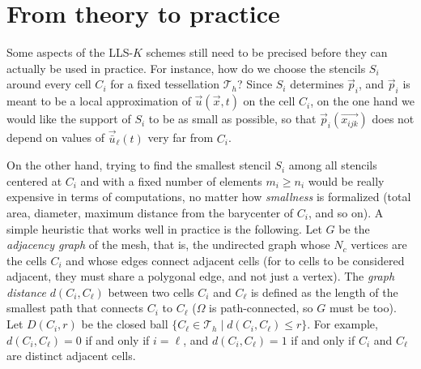 %
%
%

\section{From theory to practice} \label{sec:theory-to-practice}
Some aspects of the LLS-$K$ schemes still need to be precised
before they can actually be used in practice. For instance, how do we choose
the stencils $S_{i}$ around every cell $C_{i}$ for a fixed tessellation
$\mathcal{T}_{h}$? Since $S_{i}$ determines $\vec{p}_{i}$, and $\vec{p}_{i}$
is meant to be a local approximation of $\vec{u}(\vec{x},t)$ on the cell
$C_{i}$, on the one hand we would like the support of $S_{i}$ to be as small
as possible, so that $\vec{p}_{i}(\vec{x_{ijk}})$ does not depend on
values of $\vec{\bar{u}}_{\ell}(t)$ very far from $C_{i}$.

On the other hand, trying to find the smallest stencil
$S_{i}$ among all stencils centered at $C_{i}$ and with a fixed number of
elements $m_{i}\geq n_{i}$ would be really expensive in terms of computations,
no matter how \emph{smallness} is formalized (total area, diameter, maximum
distance from the barycenter of $C_{i}$, and so on). A simple heuristic that
works well in practice is the following.
%
Let $G$ be the \emph{adjacency graph} of the mesh, that is, the undirected
graph whose $N_{c}$ vertices are the cells $C_{i}$ and whose edges connect
adjacent cells (for to cells to be considered adjacent, they must share a
polygonal edge, and not just a vertex). The \emph{graph distance} $d(C_{i},C_{\ell})$
between two cells $C_{i}$ and $C_{\ell}$ is defined as the length of the smallest
path that connects $C_{i}$ to $C_{\ell}$ ($\Omega$ is path-connected, so $G$ must
be too). Let $D(C_{i},r)$ be the closed ball
$\{C_{\ell}\in\mathcal{T}_{h}\mid d(C_{i},C_{\ell})\leq r\}$.
For example, $d(C_{i},C_{\ell})=0$ if and only if $i=\ell$, and $d(C_{i},C_{\ell})=1$
if and only if $C_{i}$ and $C_{\ell}$ are distinct adjacent cells.

